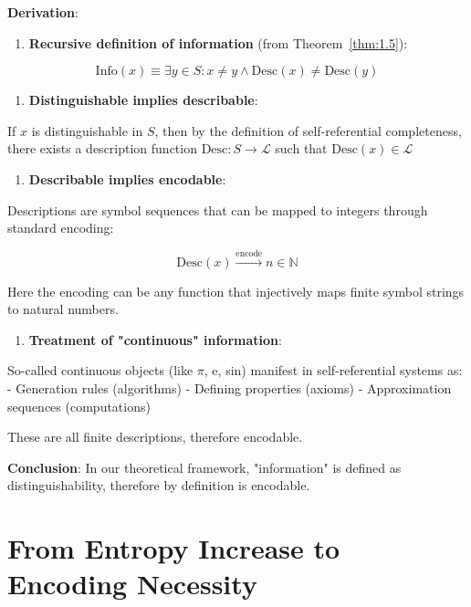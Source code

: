 \textbf{Derivation}:

\begin{enumerate}
\item \textbf{Recursive definition of information} (from Theorem~\ref{thm:1.5}):
\end{enumerate}
   
\begin{equation}
\text{Info}(x) \equiv \exists y \in S: x \neq y \land \text{Desc}(x) \neq \text{Desc}(y)
\end{equation}

\begin{enumerate}
\item \textbf{Distinguishable implies describable}:
\end{enumerate}
   If $x$ is distinguishable in $S$, then by the definition of self-referential completeness,
   there exists a description function $\text{Desc}: S \to \mathcal{L}$ such that $\text{Desc}(x) \in \mathcal{L}$

\begin{enumerate}
\item \textbf{Describable implies encodable}:
\end{enumerate}
   Descriptions are symbol sequences that can be mapped to integers through standard encoding:
   
\begin{equation}
\text{Desc}(x) \xrightarrow{\text{encode}} n \in \mathbb{N}
\end{equation}
   
   Here the encoding can be any function that injectively maps finite symbol strings to natural numbers.

\begin{enumerate}
\item \textbf{Treatment of "continuous" information}:
\end{enumerate}
   So-called continuous objects (like $\pi$, e, sin) manifest in self-referential systems as:
   - Generation rules (algorithms)
   - Defining properties (axioms)
   - Approximation sequences (computations)
   
   These are all finite descriptions, therefore encodable.

\textbf{Conclusion}: In our theoretical framework, "information" is defined as distinguishability, therefore by definition is encodable.

\section{From Entropy Increase to Encoding Necessity}
\label{sec:ch04_encoding:from-entropy-increase-to-encoding-necessity}

